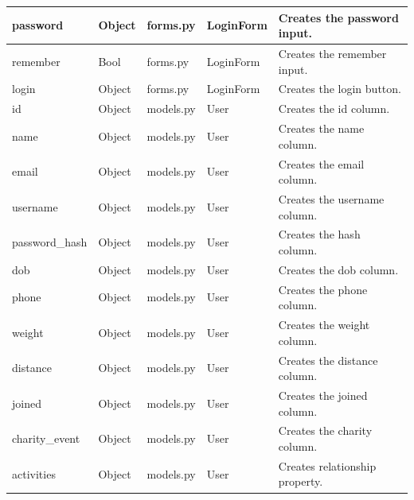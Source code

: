 \documentclass{article}[12pt,a4paper]
\begin{document}
\begin{table}[h]
\begin{tabular}{lllll}
password          & Object        & forms.py            & LoginForm               & Creates the password input.             \\ \hline
remember          & Bool          & forms.py            & LoginForm               & Creates the remember input.             \\ \hline
login             & Object        & forms.py            & LoginForm               & Creates the login button.               \\ \hline
id                & Object        & models.py           & User                    & Creates the id column.                  \\ \hline
name              & Object        & models.py           & User                    & Creates the name column.                \\ \hline
email             & Object        & models.py           & User                    & Creates the email column.               \\ \hline
username          & Object        & models.py           & User                    & Creates the username column.            \\ \hline
password\_hash    & Object        & models.py           & User                    & Creates the hash column.                \\ \hline
dob               & Object        & models.py           & User                    & Creates the dob column.                 \\ \hline
phone             & Object        & models.py           & User                    & Creates the phone column.               \\ \hline
weight            & Object        & models.py           & User                    & Creates the weight column.              \\ \hline
distance          & Object        & models.py           & User                    & Creates the distance column.            \\ \hline
joined            & Object        & models.py           & User                    & Creates the joined column.              \\ \hline
charity\_event    & Object        & models.py           & User                    & Creates the charity column.             \\ \hline
activities        & Object        & models.py           & User                    & Creates relationship property.          \\ \hline

\end{tabular}
\end{table}
\end{document}
